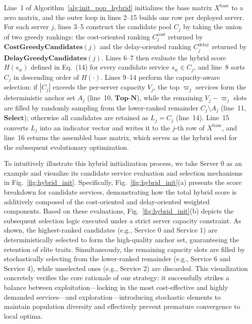 \documentclass[10pt, conference, letterpaper]{IEEEtran}
\begin{document}
Line~1 of Algorithm~\ref{alg:init_pop_hybrid} initializes the base matrix $X^{\mathrm{base}}$ to a zero
  matrix, and the outer loop in lines 2--15 builds one row per deployed server. For each server $j$, lines 3--5
  construct the candidate pool $C_j$ by taking the union of two greedy rankings: the cost-oriented ranking
  $C_j^{\mathrm{cost}}$ returned by $\textbf{CostGreedyCandidates}(j)$ and the delay-oriented ranking
  $C_j^{\mathrm{delay}}$ returned by $\textbf{DelayGreedyCandidates}(j)$. Lines 6--7 then evaluate the hybrid
  score $H(s_w)$ defined in Eq.~(14) for every candidate service $s_w \in C_j$, and line~8
  sorts $C_j$ in descending order of $H(\cdot)$. Lines 9--14 perform the capacity-aware selection: if $|C_j|$
  exceeds the per-server capacity $V_j$, the top $\varpi_j$ services form the deterministic anchor set $A_j$
  (line~10, $\textbf{Top-N}$), while the remaining $V_j - \varpi_j$ slots are filled by randomly sampling from
  the lower-ranked remainder $C_j \setminus A_j$ (line~11, $\textbf{Select}$); otherwise all candidates are
  retained as $L_j = C_j$ (line~14). Line~15 converts $L_j$ into an indicator vector and writes it to the $j$-th
   row of $X^{\mathrm{base}}$, and line~16 returns the assembled base matrix, which serves as the hybrid seed
  for the subsequent evolutionary optimization.

To intuitively illustrate this hybrid initialization process, we take Server 0 as an example and visualize its candidate service evaluation and selection mechanisms in Fig.~\ref{fig:hybrid_init}. Specifically, Fig.~\ref{fig:hybrid_init}(a) presents the score breakdown for candidate services, demonstrating how the total hybrid score is additively composed of the cost-oriented and delay-oriented weighted components. Based on these evaluations, Fig.~\ref{fig:hybrid_init}(b) depicts the subsequent selection logic executed under a strict server capacity constraint. As shown, the highest-ranked candidates (e.g., Service 0 and Service 1) are deterministically selected to form the high-quality anchor set, guaranteeing the retention of elite traits. Simultaneously, the remaining capacity slots are filled by stochastically selecting from the lower-ranked remainder (e.g., Service 6 and Service 4), while unselected ones (e.g., Service 2) are discarded. This visualization concretely verifies the core rationale of our strategy: it successfully strikes a balance between exploitation---locking in the most cost-effective and highly demanded services---and exploration---introducing stochastic elements to maintain population diversity and effectively prevent premature convergence to local optima.
\end{document}
